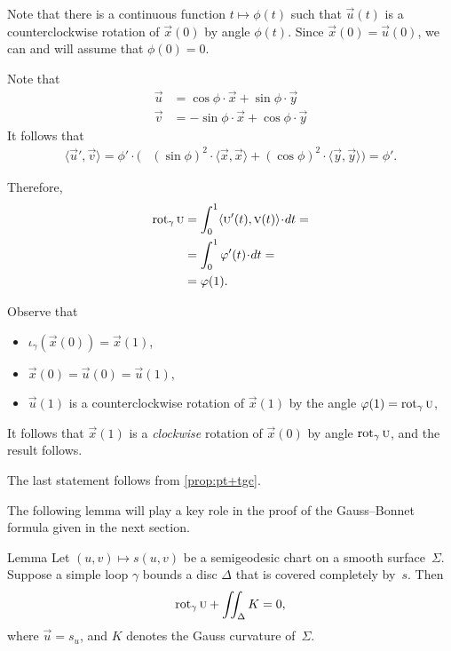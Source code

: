 Note that there is a continuous function $t\mapsto \phi(t)$ such that 
$\vec u(t)$ is a counterclockwise rotation of $\vec x(0)$ by angle $\phi(t)$.
Since $\vec x(0)=\vec u(0)$, we can and will assume that $\phi(0)=0$.

Note that
\begin{align*}
\vec u&=\cos\phi\cdot \vec x+\sin\phi\cdot \vec y
\\
\vec v&=-\sin\phi\cdot \vec x+\cos\phi\cdot \vec y
\end{align*}
It follows that 
\begin{align*}
\langle\vec u',\vec v\rangle
=\phi'\cdot\biggl(&(\sin \phi)^2\cdot \langle\vec x,\vec x\rangle+(\cos \phi)^2\cdot \langle\vec y,\vec y\rangle
\biggr)=
\phi'.
\end{align*}

Therefore,
\begin{align*}
\rot_\gamma\vec u&=\int_0^1\langle\vec u'(t),\vec v(t)\rangle\cdot dt=
\\
&=\int_0^1\phi'(t)\cdot dt=
\\
&=\phi(1).
\end{align*}

Observe that 
\begin{itemize}
\item $\iota_\gamma(\vec x(0))=\vec x(1)$,

\item  $\vec x (0) = \vec u (0) = \vec u (1),$ 

\item $\vec u(1)$ is a counterclockwise rotation of $\vec x(1)$ by the angle $\phi(1)\z=\rot_\gamma\vec u$,

\end{itemize}
It follows that $\vec x(1)$ is a \textit{clockwise} rotation of $\vec x(0)$ by angle $\mathop{\rm rot}\nolimits_\gamma\text{\sc{u}}$, and the result follows.

The last statement follows from \ref{prop:pt+tgc}.
\qeds

The following lemma will play a key role in the proof of the Gauss--Bonnet formula given in the next section.

\begin{thm}{Lemma}\label{lem:rotation-semigeoesic}
Let $(u,v)\mapsto s(u,v)$ be a semigeodesic chart on a smooth surface~$\Sigma$.
Suppose a simple loop $\gamma$ bounds a disc $\Delta$ that is covered completely by~$s$.
Then 
\[\mathop{\rm rot}\nolimits_\gamma\text{\sc{u}}+\iint_\Delta K=0,\]
where $\vec u=s_u$, and $K$ denotes the Gauss curvature of~$\Sigma$.
\end{thm}


